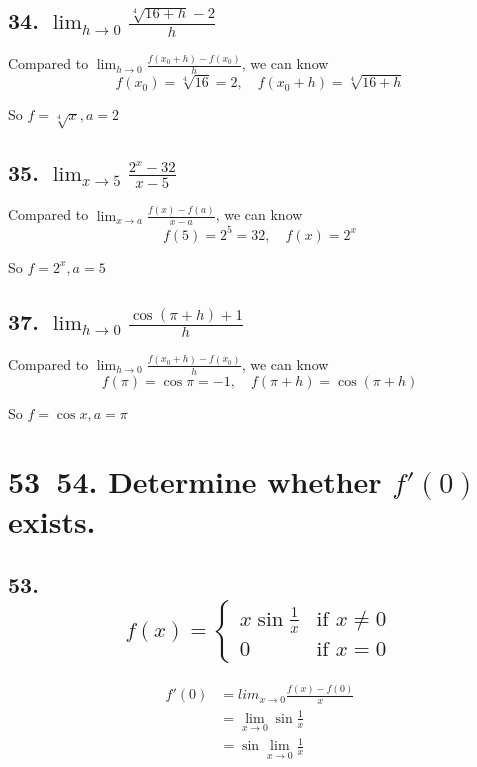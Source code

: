 \documentclass{article}
\begin{document}
    \subsection*{34. $\lim_{h \to 0}\frac{\sqrt[4]{16 + h} - 2}{h}$}

    Compared to $\lim_{h \to 0}\frac{f(x_0 + h) - f(x_0)}{h}$, we can know $$f(x_0) = \sqrt[4]{16} = 2, \quad f(x_0 + h) = \sqrt[4]{16 + h}$$

    So $f = \sqrt[4]x, a = 2$
    
    \subsection*{35. $\lim_{x \to 5}\frac{2^x - 32}{x - 5}$}

    Compared to $\lim_{x \to a}\frac{f(x) - f(a)}{x - a}$, we can know $$f(5) = 2^5 = 32, \quad f(x) = 2^x$$

    So $f = 2^x, a = 5$

    \subsection*{37. $\lim_{h \to 0}\frac{\cos(\pi + h) + 1}{h}$}

    Compared to $\lim_{h \to 0}\frac{f(x_0 + h) - f(x_0)}{h}$, we can know $$f(\pi) = \cos \pi = -1, \quad f(\pi + h) = \cos(\pi + h)$$

    So $f = \cos x, a = \pi$

    \section*{53~54. Determine whether $f'(0)$ exists.}

    \subsection*{53. $$f(x) = \left\{ \begin{array}{ll}
        x\sin\frac 1 x & \textrm{if $x \not = 0$} \\
        0 & \textrm{if $x = 0$}
    \end{array} \right.$$}

    $$
    \begin{aligned}
        f'(0) &= lim_{x \to 0}\frac{f(x) - f(0)}{x} \\
        &= \lim_{x \to 0}\sin \frac 1 x \\
        &= \sin \lim_{x \to 0}\frac 1 x
    \end{aligned}
    $$
\end{document}
